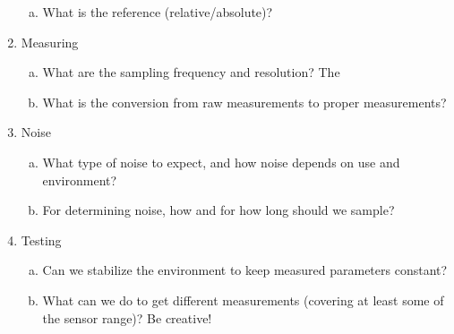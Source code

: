 \begin{enumerate}
\begin{enumerate}[(a)]
            \item What is the reference (relative/absolute)?
        \end{enumerate}
    \item Measuring
        \begin{enumerate}[(a)]
            \item What are the sampling frequency and resolution?
            The 
            \item What is the conversion from raw measurements to proper measurements?
        \end{enumerate}
    \item Noise
        \begin{enumerate}[(a)]
            \item What type of noise to expect, and how noise depends on use and environment?
            \item For determining noise, how and for how long should we sample?
        \end{enumerate}
    \item Testing
        \begin{enumerate}[(a)]
            \item Can we stabilize the environment to keep measured parameters constant?
            \item What can we do to get different measurements (covering at least some of the sensor range)? Be creative!
        \end{enumerate}
\end{enumerate}





